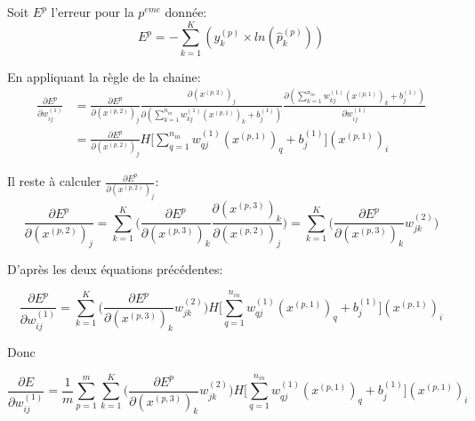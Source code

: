 \documentclass[a4paper,11pt,oneside,roman]{article}
\begin{document}
    Soit $E^p$ l'erreur pour la $p^{eme}$ donnée:
    \begin{equation}
        \nonumber
        E^p = - \sum\limits_{k=1}^K (y_{k}^{(p)} \times ln(\hat{p}_{k}^{(p)}))
    \end{equation}

    En appliquant la règle de la chaine:
    \begin{equation}
        \begin{aligned}
            \nonumber
            \frac{\partial E^p}{\partial w_{ij}^{(1)}} & = \frac{\partial E^p}{\partial (x^{(p,2)})_j} \frac{\partial (x^{(p,2)})_j}{\partial (\sum\limits_{k=1}^{n_{in}} w_{kj}^{(1)}(x^{(p,1)})_{k} + b_j^{(1)})} \frac{\partial (\sum\limits_{k=1}^{n_{in}} w_{kj}^{(1)}(x^{(p,1)})_{k} + b_j^{(1)})}{\partial w_{ij}^{(1)}} \\
            & = \frac{\partial E^p}{\partial (x^{(p,2)})_j} H\big[\sum\limits_{q=1}^{n_{in}} w_{qj}^{(1)}(x^{(p,1)})_{q} + b_j^{(1)}\big] (x^{(p,1)})_i
        \end{aligned}
    \end{equation}

    Il reste à calculer $\frac{\partial E^p}{\partial (x^{(p,2)})_j}$:
    \begin{equation}
        \nonumber
        \frac{\partial E^p}{\partial (x^{(p,2)})_j}  = \sum\limits_{k=1}^{K} \Big(\frac{\partial E^p}{\partial (x^{(p,3)})_k} \frac{\partial (x^{(p,3)})_k}{\partial (x^{(p,2)})_j}\Big) = \sum\limits_{k=1}^{K} \Big(\frac{\partial E^p}{\partial (x^{(p,3)})_k} w_{jk}^{(2)}\Big)
    \end{equation}

    D'après les deux équations précédentes:

    \begin{equation}
        \nonumber
        \frac{\partial E^p}{\partial w_{ij}^{(1)}} = \sum\limits_{k=1}^{K} \Big(\frac{\partial E^p}{\partial (x^{(p,3)})_k} w_{jk}^{(2)}\Big) H\big[\sum\limits_{q=1}^{n_{in}} w_{qj}^{(1)}(x^{(p,1)})_{q} + b_j^{(1)}\big] (x^{(p,1)})_i
    \end{equation}

    Donc

    \begin{equation}
        \frac{\partial E}{\partial w_{ij}^{(1)}} = \frac{1}{m}\sum\limits_{p=1}^{m}\sum\limits_{k=1}^{K} \Big(\frac{\partial E^p}{\partial (x^{(p,3)})_k} w_{jk}^{(2)}\Big) H\big[\sum\limits_{q=1}^{n_{in}} w_{qj}^{(1)}(x^{(p,1)})_{q} + b_j^{(1)}\big] (x^{(p,1)})_i
        \label{backprop}
    \end{equation}
\end{document}
